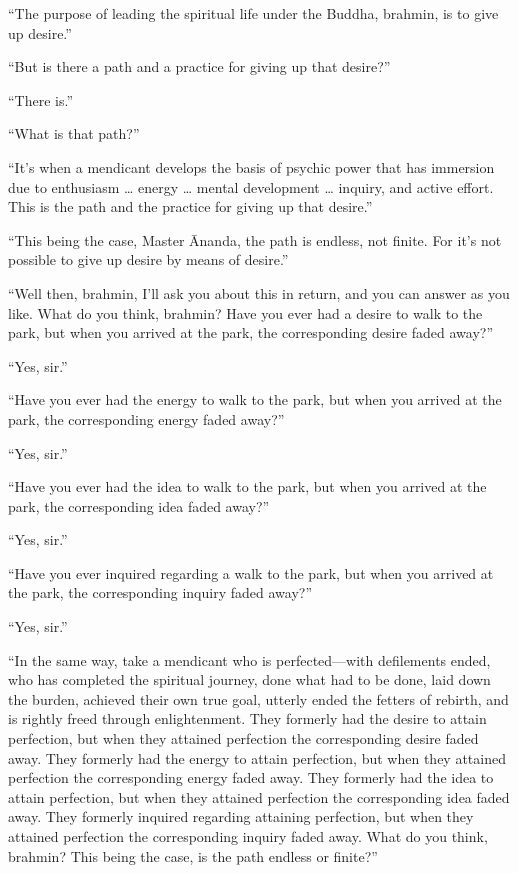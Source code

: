 \documentclass[12pt,openany]{book}%
\begin{document}
“The purpose of leading the spiritual life under the Buddha, brahmin, is to give up desire.” 

“But is there a path and a practice for giving up that desire?” 

“There is.” 

“What is that path?” 

“It’s when a mendicant develops the basis of psychic power that has immersion due to enthusiasm … energy … mental development … inquiry, and active effort. This is the path and the practice for giving up that desire.” 

“This being the case, Master Ānanda, the path is endless, not finite. For it’s not possible to give up desire by means of desire.” 

“Well then, brahmin, I’ll ask you about this in return, and you can answer as you like. What do you think, brahmin? Have you ever had a desire to walk to the park, but when you arrived at the park, the corresponding desire faded away?” 

“Yes, sir.” 

“Have you ever had the energy to walk to the park, but when you arrived at the park, the corresponding energy faded away?” 

“Yes, sir.” 

“Have you ever had the idea to walk to the park, but when you arrived at the park, the corresponding idea faded away?” 

“Yes, sir.” 

“Have you ever inquired regarding a walk to the park, but when you arrived at the park, the corresponding inquiry faded away?” 

“Yes, sir.” 

“In the same way, take a mendicant who is perfected—with defilements ended, who has completed the spiritual journey, done what had to be done, laid down the burden, achieved their own true goal, utterly ended the fetters of rebirth, and is rightly freed through enlightenment. They formerly had the desire to attain perfection, but when they attained perfection the corresponding desire faded away. They formerly had the energy to attain perfection, but when they attained perfection the corresponding energy faded away. They formerly had the idea to attain perfection, but when they attained perfection the corresponding idea faded away. They formerly inquired regarding attaining perfection, but when they attained perfection the corresponding inquiry faded away. What do you think, brahmin? This being the case, is the path endless or finite?” 
\end{document}
